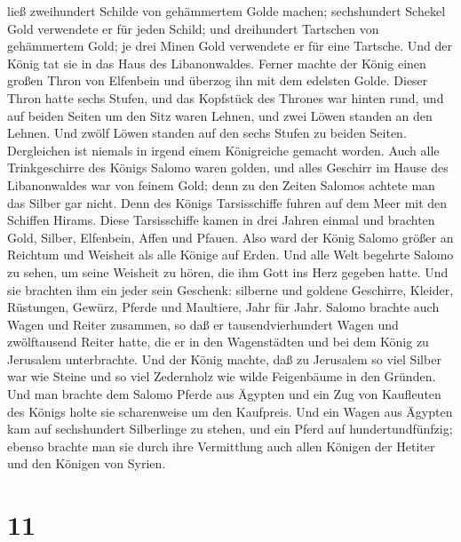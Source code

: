 ließ zweihundert Schilde von gehämmertem Golde machen; sechshundert
Schekel Gold verwendete er für jeden Schild;  und
dreihundert Tartschen von gehämmertem Gold; je drei Minen Gold
verwendete er für eine Tartsche. Und der König tat sie in das Haus des
Libanonwaldes.  Ferner machte der König einen großen
Thron von Elfenbein und überzog ihn mit dem edelsten Golde.
 Dieser Thron hatte sechs Stufen, und das Kopfstück des
Thrones war hinten rund, und auf beiden Seiten um den Sitz waren Lehnen,
und zwei Löwen standen an den Lehnen.  Und zwölf Löwen
standen auf den sechs Stufen zu beiden Seiten. Dergleichen ist niemals
in irgend einem Königreiche gemacht worden.  Auch alle
Trinkgeschirre des Königs Salomo waren golden, und alles Geschirr im
Hause des Libanonwaldes war von feinem Gold; denn zu den Zeiten Salomos
achtete man das Silber gar nicht.  Denn des Königs
Tarsisschiffe fuhren auf dem Meer mit den Schiffen Hirams. Diese
Tarsisschiffe kamen in drei Jahren einmal und brachten Gold, Silber,
Elfenbein, Affen und Pfauen.  Also ward der König Salomo
größer an Reichtum und Weisheit als alle Könige auf Erden.
 Und alle Welt begehrte Salomo zu sehen, um seine
Weisheit zu hören, die ihm Gott ins Herz gegeben hatte. 
Und sie brachten ihm ein jeder sein Geschenk: silberne und goldene
Geschirre, Kleider, Rüstungen, Gewürz, Pferde und Maultiere, Jahr für
Jahr.  Salomo brachte auch Wagen und Reiter zusammen, so
daß er tausendvierhundert Wagen und zwölftausend Reiter hatte, die er in
den Wagenstädten und bei dem König zu Jerusalem unterbrachte.
 Und der König machte, daß zu Jerusalem so viel Silber
war wie Steine und so viel Zedernholz wie wilde Feigenbäume in den
Gründen.  Und man brachte dem Salomo Pferde aus Ägypten
und ein Zug von Kaufleuten des Königs holte sie scharenweise um den
Kaufpreis.  Und ein Wagen aus Ägypten kam auf
sechshundert Silberlinge zu stehen, und ein Pferd auf hundertundfünfzig;
ebenso brachte man sie durch ihre Vermittlung auch allen Königen der
Hetiter und den Königen von Syrien.

\hypertarget{section-10}{%
\section{11}\label{section-10}}

